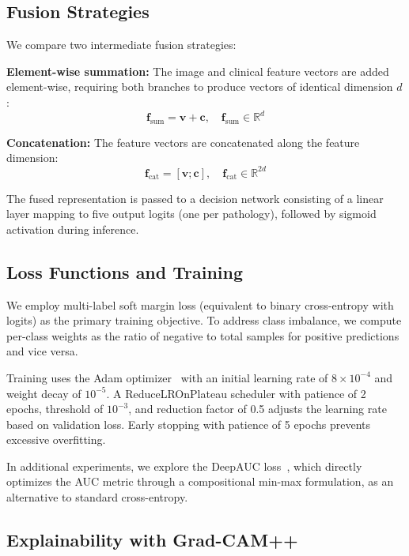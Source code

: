 \documentclass[conference]{IEEEtran}
\begin{document}
\subsection{Fusion Strategies}

We compare two intermediate fusion strategies:

\textbf{Element-wise summation:} The image and clinical feature vectors are added element-wise, requiring both branches to produce vectors of identical dimension $d$:
\begin{equation}
\mathbf{f}_{\text{sum}} = \mathbf{v} + \mathbf{c}, \quad \mathbf{f}_{\text{sum}} \in \mathbb{R}^{d}
\label{eq:sum}
\end{equation}

\textbf{Concatenation:} The feature vectors are concatenated along the feature dimension:
\begin{equation}
\mathbf{f}_{\text{cat}} = [\mathbf{v}; \mathbf{c}], \quad \mathbf{f}_{\text{cat}} \in \mathbb{R}^{2d}
\label{eq:cat}
\end{equation}

The fused representation is passed to a decision network consisting of a linear layer mapping to five output logits (one per pathology), followed by sigmoid activation during inference.

\subsection{Loss Functions and Training}

We employ multi-label soft margin loss (equivalent to binary cross-entropy with logits) as the primary training objective. To address class imbalance, we compute per-class weights as the ratio of negative to total samples for positive predictions and vice versa.

Training uses the Adam optimizer~\cite{kingma2015adam} with an initial learning rate of $8 \times 10^{-4}$ and weight decay of $10^{-5}$. A ReduceLROnPlateau scheduler with patience of 2 epochs, threshold of $10^{-3}$, and reduction factor of 0.5 adjusts the learning rate based on validation loss. Early stopping with patience of 5 epochs prevents excessive overfitting.

In additional experiments, we explore the DeepAUC loss~\cite{yuan2021deepauc}, which directly optimizes the AUC metric through a compositional min-max formulation, as an alternative to standard cross-entropy.

\subsection{Explainability with Grad-CAM++}
\end{document}
